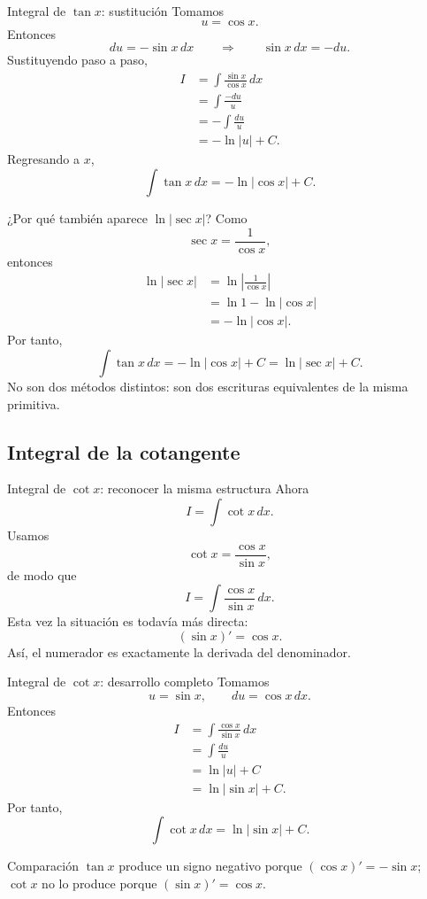 \documentclass[10pt,aspectratio=169]{beamer}
\begin{document}
\begin{frame}{Integral de $\tan x$: sustitución}
Tomamos
\[
\boxed{u=\cos x}.
\]
Entonces
\[
du=-\sin x\,dx
\qquad\Longrightarrow\qquad
\sin x\,dx=-du.
\]
Sustituyendo paso a paso,
\begin{align*}
I
&=\int\frac{\sin x}{\cos x}\,dx\\
&=\int\frac{-du}{u}\\
&=-\int\frac{du}{u}\\
&=-\ln|u|+C.
\end{align*}
Regresando a $x$,
\[
\boxed{\int\tan x\,dx=-\ln|\cos x|+C.}
\]
\end{frame}

\begin{frame}{¿Por qué también aparece $\ln|\sec x|$?}
Como
\[
\sec x=\frac{1}{\cos x},
\]
entonces
\begin{align*}
\ln|\sec x|
&=\ln\left|\frac{1}{\cos x}\right|\\
&=\ln 1-\ln|\cos x|\\
&=-\ln|\cos x|.
\end{align*}
Por tanto,
\[
\boxed{
\int\tan x\,dx
=-\ln|\cos x|+C
=\ln|\sec x|+C.}
\]
No son dos métodos distintos: son dos escrituras equivalentes de la misma primitiva.
\end{frame}

\subsection{Integral de la cotangente}
\begin{frame}{Integral de $\cot x$: reconocer la misma estructura}
Ahora
\[
I=\int\cot x\,dx.
\]
Usamos
\[
\cot x=\frac{\cos x}{\sin x},
\]
de modo que
\[
I=\int\frac{\cos x}{\sin x}\,dx.
\]
Esta vez la situación es todavía más directa:
\[
(\sin x)'=\cos x.
\]
Así, el numerador es exactamente la derivada del denominador.
\end{frame}

\begin{frame}{Integral de $\cot x$: desarrollo completo}
Tomamos
\[
\boxed{u=\sin x},\qquad du=\cos x\,dx.
\]
Entonces
\begin{align*}
I
&=\int\frac{\cos x}{\sin x}\,dx\\
&=\int\frac{du}{u}\\
&=\ln|u|+C\\
&=\boxed{\ln|\sin x|+C}.
\end{align*}
Por tanto,
\[
\boxed{\int\cot x\,dx=\ln|\sin x|+C.}
\]
\begin{block}{Comparación}
$\tan x$ produce un signo negativo porque $(\cos x)'=-\sin x$; $\cot x$ no lo produce porque $(\sin x)'=\cos x$.
\end{block}
\end{frame}
\end{document}
